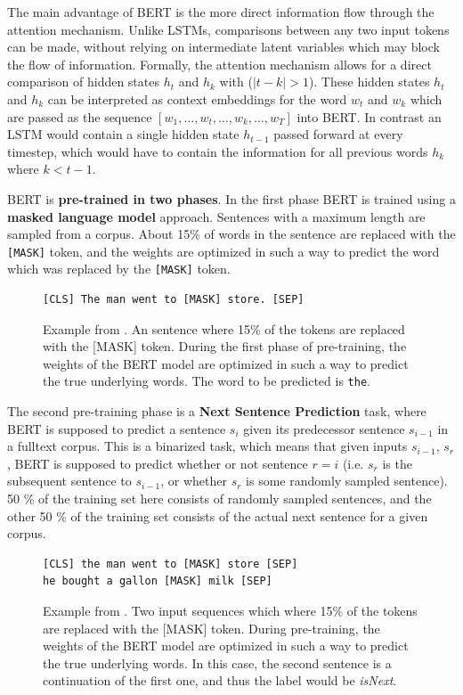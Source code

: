 \documentclass[a4paper,12pt,twoside,openright]{report}
\begin{document}
The main advantage of BERT is the more direct information flow through the attention mechanism. 
Unlike LSTMs, comparisons between any two input tokens can be made, without relying on intermediate latent variables which may block the flow of information.
Formally, the attention mechanism allows for a direct comparison of hidden states $h_t$ and $h_k$ with ($|t - k| > 1$).
These hidden states $h_t$ and $h_k$ can be interpreted as context  embeddings for the word $w_t$ and $w_k$ which are passed as the sequence $[w_1, \ldots, w_t, \ldots, w_k, \ldots, w_T]$ into BERT.
In contrast  an LSTM would contain a single hidden state $h_{t-1}$ passed forward at every timestep, which would have to contain the information for all previous words $h_k$ where $k < t - 1$.

BERT is \textbf{pre-trained in two phases}. 
In the first phase BERT is trained using a \textbf{masked language model} approach. 
Sentences with a maximum length are sampled from a corpus.
About 15\% of words in the sentence are replaced with the \texttt{[MASK]} token, and the weights are optimized in such a way to predict the word which was replaced by the \Verb#[MASK]# token.

\begin{tcolorbox}
\begin{figure}[H]
\begin{verbatim}
[CLS] The man went to [MASK] store. [SEP]
\end{verbatim}
\caption{Example from \cite{devlin18}. 
An sentence where 15\% of the tokens are replaced with the [MASK] token. 
During the first phase of pre-training, the weights of the BERT model are optimized in such a way to predict the true underlying words.
The word to be predicted is \texttt{the}.
}
\end{figure}
\end{tcolorbox}

The second pre-training phase is a \textbf{Next Sentence Prediction} task, where BERT is supposed to predict a sentence $s_i$ given its predecessor sentence $s_{i-1}$ in a fulltext corpus.
This is a binarized task, which means that given inputs $s_{i-1}$, $s_r$, BERT is supposed to predict whether or not sentence $r = i$ (i.e. $s_r$ is the subsequent sentence to $s_{i-1}$, or whether $s_r$ is some randomly sampled sentence).
50 \% of the training set here consists of randomly sampled sentences, and the other 50 \% of the training set consists of the actual next sentence for a given corpus.

\begin{tcolorbox}
\begin{figure}[H]
\begin{verbatim}
[CLS] the man went to [MASK] store [SEP]
he bought a gallon [MASK] milk [SEP]
\end{verbatim}
\caption{Example from \cite{devlin18}. 
Two input sequences which where 15\% of the tokens are replaced with the [MASK] token. 
During pre-training, the weights of the BERT model are optimized in such a way to predict the true underlying words.
In this case, the second sentence is a continuation of the first one, and thus the label would be \textit{isNext}.
}
\end{figure}
\end{tcolorbox}
\end{document}
